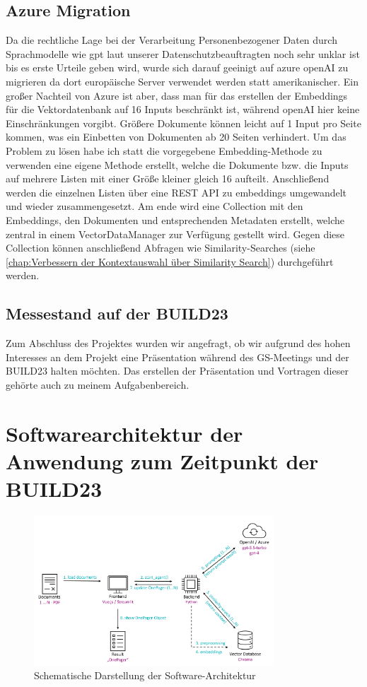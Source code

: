 \subsection{Azure Migration}
Da die rechtliche Lage bei der Verarbeitung Personenbezogener Daten durch Sprachmodelle wie gpt laut unserer Datenschutzbeauftragten noch sehr unklar ist bis es 
erste Urteile geben wird, wurde sich darauf geeinigt auf azure openAI zu migrieren da dort europäische Server verwendet werden statt amerikanischer.
Ein großer Nachteil von Azure ist aber, dass man für das erstellen der Embeddings für die Vektordatenbank auf 16 Inputs beschränkt ist, während openAI hier 
keine Einschränkungen vorgibt. Größere Dokumente können leicht auf 1 Input pro Seite kommen, was ein Einbetten von Dokumenten ab 20 Seiten verhindert.
Um das Problem zu lösen habe ich statt die vorgegebene Embedding-Methode zu verwenden eine eigene Methode erstellt, welche die Dokumente bzw. die Inputs auf 
mehrere Listen mit einer Größe kleiner gleich 16 aufteilt. Anschließend werden die einzelnen Listen über eine REST API zu embeddings umgewandelt und 
wieder zusammengesetzt. Am ende wird eine Collection mit den Embeddings, den Dokumenten und entsprechenden Metadaten erstellt, welche zentral in einem 
VectorDataManager zur Verfügung gestellt wird. Gegen diese Collection können anschließend Abfragen wie Similarity-Searches (siehe 
\ref{chap:Verbessern der Kontextauswahl über Similarity Search}) durchgeführt werden. 

\subsection{Messestand auf der BUILD23}

Zum Abschluss des Projektes wurden wir angefragt, ob wir 
aufgrund des hohen Interesses an dem Projekt eine Präsentation während des GS-Meetings und der BUILD23 halten möchten. 
Das erstellen der Präsentation und Vortragen dieser gehörte auch zu meinem Aufgabenbereich.

\section{Softwarearchitektur der Anwendung zum Zeitpunkt der BUILD23}

\begin{figure}[h]
    \centering
    \includegraphics[width=0.8\textwidth]{figures/DokumentenAgent-Uebersicht.png}
    \caption{Schematische Darstellung der Software-Architektur}
    \label{fig:DokumentenAgent-uebersicht}    %
\end{figure}

